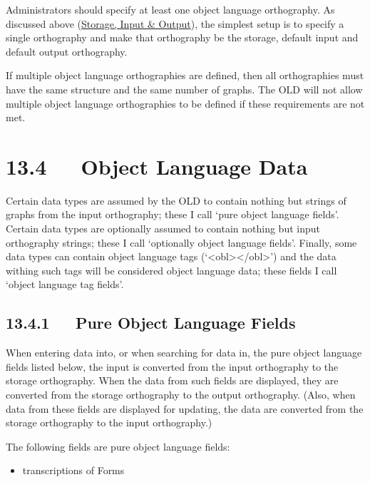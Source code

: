 \documentclass[letterpaper,10pt,english]{sphinxmanual}
\begin{document}
Administrators should specify at least one object language orthography.  As
discussed above ({\hyperref[documentation:storage-input-output]{Storage, Input \& Output}}), the simplest setup is to specify
a single orthography and make that orthography be the storage, default input and
default output orthography.

If multiple object language orthographies are defined, then all orthographies
must have the same structure and the same number of graphs.  The OLD will not
allow multiple object language orthographies to be defined if these requirements
are not met.


\section{13.4   Object Language Data}
\label{documentation:object-language-data}
Certain data types are assumed by the OLD to contain nothing but strings of
graphs from the input orthography; these I call `pure object language fields'.
Certain data types are optionally assumed to contain nothing but input
orthography strings; these I call `optionally object language fields'.  Finally,
some data types can contain object language tags (`\textless{}obl\textgreater{}\textless{}/obl\textgreater{}') and the data
withing such tags will be considered object language data; these fields I call
`object language tag fields'.


\subsection{13.4.1   Pure Object Language Fields}
\label{documentation:pure-object-language-fields}
When entering data into, or when searching for data in, the pure object language
fields listed below, the input is converted from the input orthography to the
storage orthography.  When the data from such fields are displayed, they are
converted from the storage orthography to the output orthography.  (Also, when
data from these fields are displayed for updating, the data are converted from
the storage orthography to the input orthography.)

The following fields are pure object language fields:
\begin{itemize}
\item {} 
transcriptions of Forms

\end{itemize}
\end{document}
